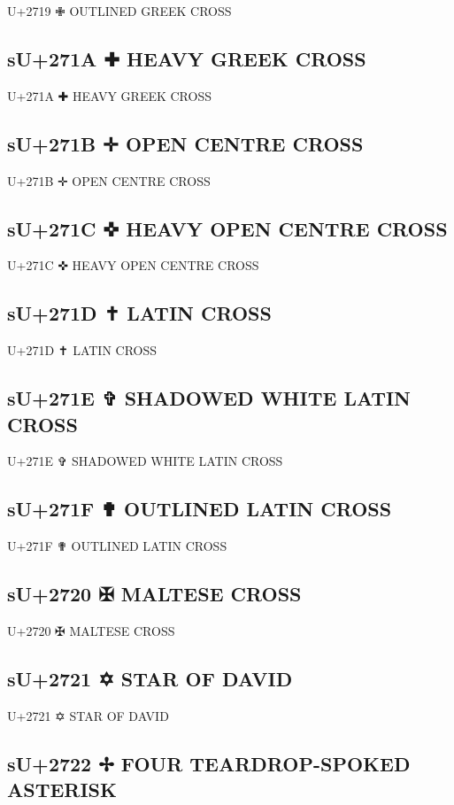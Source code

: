 U+2719 ✙ OUTLINED GREEK CROSS

\subsection{sU+271A ✚ HEAVY GREEK CROSS}

U+271A ✚ HEAVY GREEK CROSS

\subsection{sU+271B ✛ OPEN CENTRE CROSS}

U+271B ✛ OPEN CENTRE CROSS

\subsection{sU+271C ✜ HEAVY OPEN CENTRE CROSS}

U+271C ✜ HEAVY OPEN CENTRE CROSS

\subsection{sU+271D ✝ LATIN CROSS}

U+271D ✝ LATIN CROSS

\subsection{sU+271E ✞ SHADOWED WHITE LATIN CROSS}

U+271E ✞ SHADOWED WHITE LATIN CROSS

\subsection{sU+271F ✟ OUTLINED LATIN CROSS}

U+271F ✟ OUTLINED LATIN CROSS

\subsection{sU+2720 ✠ MALTESE CROSS}

U+2720 ✠ MALTESE CROSS

\subsection{sU+2721 ✡ STAR OF DAVID}

U+2721 ✡ STAR OF DAVID

\subsection{sU+2722 ✢ FOUR TEARDROP-SPOKED ASTERISK}

